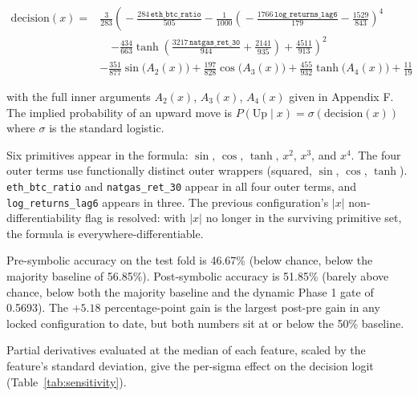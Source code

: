 \documentclass[12pt,a4paper,oneside]{article}
\begin{document}
\begin{equation}
\label{eq:decision_function}
\begin{split}
\text{decision}(x) ={}
& \tfrac{3}{283}\!\left(\!-\tfrac{284\,\texttt{eth\_btc\_ratio}}{505} - \tfrac{1}{1000}\!\left(\!-\tfrac{1766\,\texttt{log\_returns\_lag6}}{179} - \tfrac{1529}{843}\!\right)^{\!4} \right. \\
& \quad \left. - \tfrac{434}{663}\tanh\!\left(\tfrac{3217\,\texttt{natgas\_ret\_30}}{944} + \tfrac{2141}{935}\right) + \tfrac{4511}{913}\right)^{\!2} \\
& - \tfrac{351}{877}\sin\!\bigl(A_2(x)\bigr) + \tfrac{197}{828}\cos\!\bigl(A_3(x)\bigr) + \tfrac{455}{932}\tanh\!\bigl(A_4(x)\bigr) + \tfrac{11}{19}
\end{split}
\end{equation}

with the full inner arguments $A_2(x)$, $A_3(x)$, $A_4(x)$ given in Appendix F. The implied probability of an upward move is $P(\text{Up} \mid x) = \sigma(\text{decision}(x))$ where $\sigma$ is the standard logistic.

Six primitives appear in the formula: $\sin$, $\cos$, $\tanh$, $x^2$, $x^3$, and $x^4$. The four outer terms use functionally distinct outer wrappers (squared, $\sin$, $\cos$, $\tanh$). \texttt{eth\_btc\_ratio} and \texttt{natgas\_ret\_30} appear in all four outer terms, and \texttt{log\_returns\_lag6} appears in three. The previous configuration's $\lvert x \rvert$ non-differentiability flag is resolved: with $\lvert x \rvert$ no longer in the surviving primitive set, the formula is everywhere-differentiable.

Pre-symbolic accuracy on the test fold is 46.67\% (below chance, below the majority baseline of 56.85\%). Post-symbolic accuracy is 51.85\% (barely above chance, below both the majority baseline and the dynamic Phase 1 gate of 0.5693). The $+5.18$ percentage-point gain is the largest post-pre gain in any locked configuration to date, but both numbers sit at or below the 50\% baseline.

Partial derivatives evaluated at the median of each feature, scaled by the feature's standard deviation, give the per-sigma effect on the decision logit (Table~\ref{tab:sensitivity}).
\end{document}
